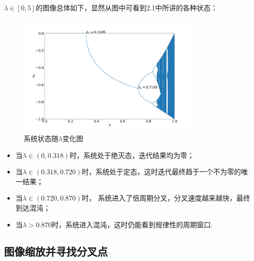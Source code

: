\documentclass[12pt,a4paper,utf8]{ctexart}
\begin{document}
$\lambda\in [0,5]$的图像总体如下，显然从图中可看到2.1中所讲的各种状态：
\begin{figure}[!h]
    \centering
    \includegraphics[width=0.8\textwidth]{half.png}
    \caption{系统状态随$\lambda$变化图}
\end{figure}
\begin{itemize}
    \item 当$\lambda \in(0,0.318)$时，系统处于绝灭态，迭代结果均为零；
    \item 当$\lambda \in(0.318,
        0.720)$时，系统处于定态，这时迭代最终趋于一个不为零的唯一结果；
    \item 当$\lambda \in (0.720, 0.870)$时，
        系统进入了倍周期分叉，分叉速度越来越快，最终到达混沌；
    \item 当$\lambda > 0.870$时，系统进入混沌，这时仍能看到规律性的周期窗口.
\end{itemize}

\subsection{图像缩放并寻找分叉点}
\end{document}
